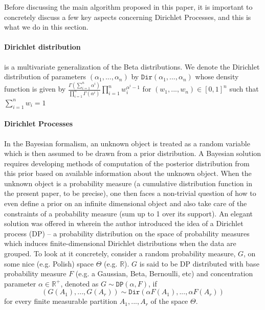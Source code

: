\documentclass[10pt]{article}
\def\R{\mathbb{R}}
\newcommand{\Dir}{\texttt{Dir}}
\newcommand{\DP}{\texttt{DP}}
\begin{document}
Before discussing the main algorithm proposed in this paper, it is important to concretely discuss a few key aspects concerning Dirichlet Processes, and this is what we do in this section. 

\paragraph{Dirichlet distribution} is a multivariate generalization of the Beta distributions.  We denote the Dirichlet distribution of parameters $(\alpha_{1},. . .,\alpha_{n})$ by $\Dir(\alpha_{1},. . .,\alpha_{n})$ whose density function is given by $\frac{\Gamma(\sum_{i=1}^{n}\alpha^{i})}{\prod_{i=1}^{n}\Gamma(\alpha^{i})} \prod_{i=1}^{n}w_{i}^{\alpha^{i}-1}$ for $(w_{1},. . .,w_{n}) \in [0,1]^{n}$ such that $\sum_{i=1}^{n}w_{i} = 1$
\paragraph{Dirichlet Processes} In the Bayesian formalism, an unknown object is treated as a random variable which is then assumed to be drawn from a prior distribution. A Bayesian solution requires developing methods of computation of the posterior distribution from this prior based on available information about the unknown object. When the unknown object is a probability measure (a cumulative distribution function in the present paper, to be precise), one then faces a non-trivial question of how to even define a prior on an infinite dimensional object and also take care of the constraints of a probability measure (sum up to 1 over its support).  An elegant solution was offered in \cite{ferguson1973bayesian} wherein the author introduced the idea
of a Dirichlet process (DP) – a probability distribution on the space of probability measures which induces finite-dimensional Dirichlet distributions when the data are grouped. To look at it concretely, consider a  random probability measure, $G$, on some nice (e.g. Polish) space $\Theta$ (e.g. $\R$). $G$ is said to be DP distributed with base probability measure $F$ (e.g. a Gaussian, Beta, Bernoulli, etc) and concentration parameter $\alpha \in \mathbb{R}^{+}$, denoted as $G \sim \DP(\alpha,F)$, if
\[(G(A_1), . . . , G(A_r)) \sim \Dir(\alpha F(A_1), . . . , \alpha F(A_r)) \]
for every finite measurable partition $A_1,...,A_r$ of the space $\Theta$. 
\end{document}
